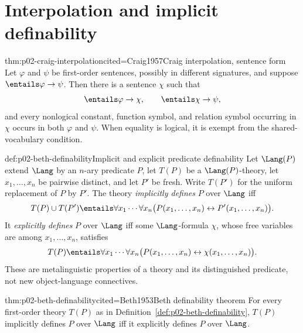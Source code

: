 \section{Interpolation and implicit definability}
\label{sec:p02-craig-beth}

\begin{hbtheorem}{thm:p02-craig-interpolation}{cited=Craig1957}{Craig interpolation, sentence form}
Let \(\varphi\) and \(\psi\) be first-order sentences, possibly in different
signatures, and suppose \(\entails\varphi\to\psi\).  Then there is a sentence
\(\chi\) such that
\[
 \entails\varphi\to\chi,
 \qquad
 \entails\chi\to\psi,
\]
and every nonlogical constant, function symbol, and relation symbol occurring
in \(\chi\) occurs in both \(\varphi\) and \(\psi\).  When equality is logical,
it is exempt from the shared-vocabulary condition.
\end{hbtheorem}

\begin{hbdefinition}{def:p02-beth-definability}{Implicit and explicit predicate definability}
Let \(\Lang(P)\) extend \(\Lang\) by an \(n\)-ary predicate \(P\),
let \(T(P)\) be a \(\Lang(P)\)-theory, let
\(x_1,\ldots,x_n\) be pairwise distinct, and let \(P'\) be fresh.
Write \(T(P')\) for the uniform replacement of \(P\) by \(P'\).  The theory
\emph{implicitly defines} \(P\) over \(\Lang\) iff
\[
 T(P)\cup T(P')\entails
 \forall x_1\cdots\forall x_n
 \bigl(P(x_1,\ldots,x_n)\leftrightarrow
       P'(x_1,\ldots,x_n)\bigr).
\]
It \emph{explicitly defines} \(P\) over \(\Lang\) iff some
\(\Lang\)-formula \(\chi\), whose free variables are among
\(x_1,\ldots,x_n\), satisfies
\[
 T(P)\entails
 \forall x_1\cdots\forall x_n
 \bigl(P(x_1,\ldots,x_n)\leftrightarrow
       \chi(x_1,\ldots,x_n)\bigr).
\]
These are metalinguistic properties of a theory and its distinguished
predicate, not new object-language connectives.
\end{hbdefinition}

\begin{hbtheorem}{thm:p02-beth-definability}{cited=Beth1953}{Beth definability theorem}
For every first-order theory \(T(P)\) as in
Definition~\ref{def:p02-beth-definability}, \(T(P)\) implicitly defines \(P\)
over \(\Lang\) iff it explicitly defines \(P\) over \(\Lang\).
\end{hbtheorem}

